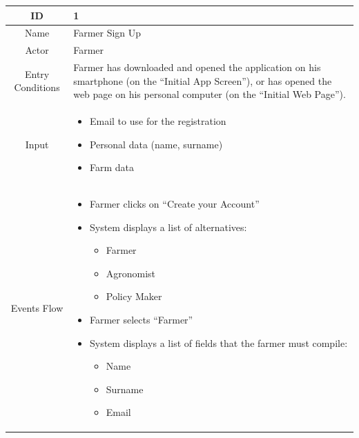 \documentclass{article}
\begin{document}
\begin{center}
    

    
    
    \begin{longtable}{|c| p{10cm}|}
        \hline
            ID & 1 \\
        \hline
            Name & Farmer Sign Up \\
        \hline
            Actor & Farmer \\
        \hline
            Entry Conditions & Farmer has downloaded and opened the application on his smartphone (on the “Initial App Screen”), or has opened the web page on his personal computer (on the “Initial Web Page”). \\
        \hline
            Input & 
                    \begin{itemize}
                        \item Email to use for the registration
                        \item Personal data (name, surname)
                        \item Farm data
                    \end{itemize}\\
        \hline
            Events Flow & 
                    \begin{itemize}
                        \item Farmer clicks on “Create your Account”
                        \item System displays a list of alternatives: 
                            \begin{itemize}
                                \item Farmer
                                \item Agronomist
                                \item Policy Maker
                            \end{itemize} 
                        \item Farmer selects “Farmer”
                        \item System displays a list of fields that the farmer must     compile: 
                            \begin{itemize}
                                \item Name
                                \item Surname
                                \item Email

\end{itemize}
\end{itemize}
\end{longtable}
\end{center}
\end{document}
